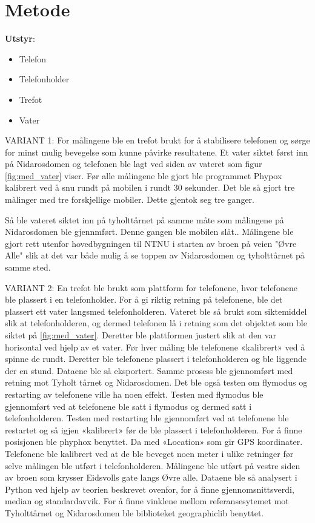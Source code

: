 \section{Metode}
\noindent\textbf{Utstyr}:
\begin{itemize}
    \item Telefon
    \item Telefonholder
    \item Trefot
    \item Vater
\end{itemize}
VARIANT 1:
For målingene ble en trefot brukt for å stabilisere telefonen og sørge for minst mulig bevegelse som kunne påvirke resultatene. Et vater siktet først inn på Nidarosdomen og telefonen ble lagt ved siden av vateret som figur \ref{fig:med_vater} viser. Før alle målingene ble gjort ble programmet Phypox kalibrert ved å snu rundt på mobilen i rundt 30 sekunder. Det ble så gjort tre målinger med tre forskjellige mobiler. Dette gjentok seg tre ganger.

Så ble vateret siktet inn på tyholttårnet på samme måte som målingene på Nidarosdomen ble gjennmført. Denne gangen ble mobilen slåt..
Målingene ble gjort rett utenfor hovedbygningen til NTNU i starten av broen på veien "Øvre Alle" slik at det var både mulig å se toppen av Nidarosdomen og tyholttårnet på samme sted.  \newline


VARIANT 2:
En trefot ble brukt som plattform for telefonene, hvor telefonene ble plassert i en telefonholder. For å gi riktig retning på telefonene, ble det plassert ett vater langsmed telefonholderen. Vateret ble så brukt som siktemiddel slik at telefonholderen, og dermed telefonen lå i retning som det objektet som ble siktet på \ref{fig:med_vater}. Deretter ble plattformen justert slik at den var horisontal ved hjelp av et vater. 
Før hver måling ble telefonene «kalibrert» ved å spinne de rundt. Deretter ble telefonene plassert i telefonholderen og ble liggende der en stund. Dataene ble så eksportert. Samme prosess ble gjennomført med retning mot Tyholt tårnet og Nidarosdomen. 
Det ble også testen om flymodus og restarting av telefonene ville ha noen effekt. Testen med flymodus ble gjennomført ved at telefonene ble satt i flymodus og dermed satt i telefonholderen. Testen med restarting ble gjennomført ved at telefonene ble restartet og så igjen «kalibrert» før de ble plassert i telefonholderen.
For å finne posisjonen ble phyphox benyttet. Da med «Location» som gir GPS koordinater. Telefonene ble kalibrert ved at de ble beveget noen meter i ulike retninger før selve målingen ble utført i telefonholderen. Målingene ble utført på vestre siden av broen som krysser Eidsvolls gate langs Øvre alle. 
Dataene ble så analysert i Python ved hjelp av teorien beskrevet ovenfor, for å finne gjennomsnittsverdi, median og standardavvik. For å finne vinklene mellom referansesytemet mot Tyholttårnet og Nidarosdomen ble biblioteket geographiclib benyttet.  

